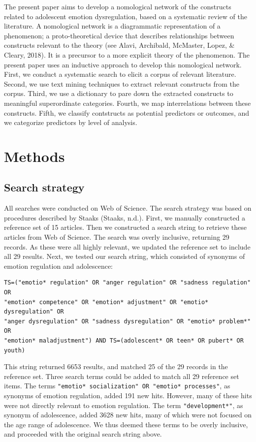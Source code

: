 \documentclass[
  english,
  man]{apa6}
\begin{document}
The present paper aims to develop a nomological network of the constructs
related to adolescent emotion dysregulation, based on a systematic review of
the literature. A nomological network is a diagrammatic representation of a
phenomenon; a proto-theoretical device that describes relationships between
constructs relevant to the theory (see Alavi, Archibald, McMaster, Lopez, \& Cleary, 2018). It is a precursor to a more
explicit theory of the phenomenon. The present paper uses an inductive approach
to develop this nomological network. First, we conduct a systematic search to
elicit a corpus of relevant literature. Second, we use text mining techniques
to extract relevant constructs from the corpus. Third, we use a dictionary to
pare down the extracted constructs to meaningful superordinate categories.
Fourth, we map interrelations between these constructs. Fifth, we classify
contstructs as potential predictors or outcomes, and we categorize predictors
by level of analysis.

\hypertarget{methods}{%
\section{Methods}\label{methods}}

\hypertarget{search-strategy}{%
\subsection{Search strategy}\label{search-strategy}}

All searches were conducted on Web of Science. The search strategy was based on
procedures described by Staaks (Staaks, n.d.). First, we
manually constructed a reference set of 15 articles. Then we constructed a
search string to retrieve these articles from Web of Science. The search was
overly inclusive, returning 29 records. As these were all highly relevant, we
updated the reference set to include all 29 results. Next, we tested our search
string, which consisted of synonyms of emotion regulation and adolescence:

\begin{verbatim}
TS=("emotio* regulation" OR "anger regulation" OR "sadness regulation" OR
"emotion* competence" OR "emotion* adjustment" OR "emotio* dysregulation" OR
"anger dysregulation" OR "sadness dysregulation" OR "emotio* problem*" OR
"emotion* maladjustment") AND TS=(adolescent* OR teen* OR pubert* OR youth)
\end{verbatim}

This string returned 6653 results, and matched 25 of the 29 records in the
reference set. Three search terms could be added to match all 29 reference set
items. The terms \texttt{"emotio*\ socialization"\ OR\ "emotio*\ processes"}, as synonyms
of emotion regulation, added 191 new hits. However, many of these hits were not
directly relevant to emotion regulation. The term \texttt{"development*"}, as synonym
of adolescence, added 3628 new hits, many of which were not focused on the age
range of adolescence. We thus deemed these terms to be overly inclusive, and
proceeded with the original search string above.
\end{document}
